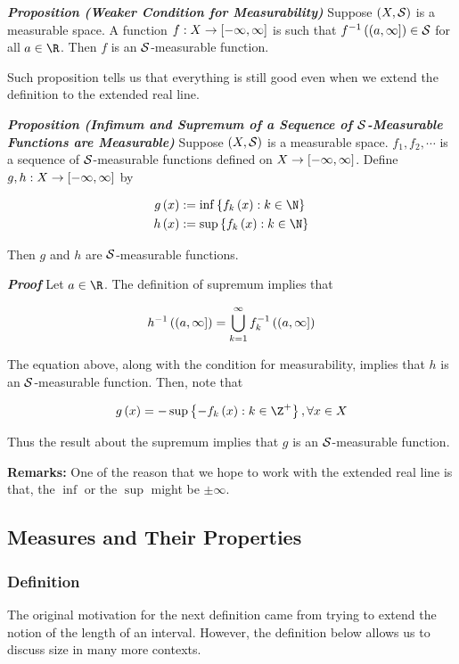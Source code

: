 \documentclass[
]{article}
\begin{document}
\emph{\textbf{Proposition (Weaker Condition for Measurability)}} Suppose
\(\pr{X,\S}\) is a measurable space. A function
\(f:X\to \br{-\infty,\infty}\) is such that
\(\inv f\pr{(a,\infty]}\in \S\) for all \(a \in \R\). Then \(f\) is an
\(\S\)-measurable function.

Such proposition tells us that everything is still good even when we
extend the definition to the extended real line.

\emph{\textbf{Proposition (Infimum and Supremum of a Sequence of
\(\S\)-Measurable Functions are Measurable)}} Suppose \(\pr{X,\S}\) is a
measurable space. \(f_1,f_2,\cdots\) is a sequence of \(\S\)-measurable
functions defined on \(X\to \br{-\infty,\infty}\). Define
\(g,h:X\to\br{-\infty,\infty}\) by

\[\ba
g\pr x &:= \inf\brace{f_k\pr x:k\in \N}\\
h\pr x &:= \sup\brace{f_k\pr x:k\in \N}
\ea\]

Then \(g\) and \(h\) are \(\S\)-measurable functions.

\emph{\textbf{Proof}} Let \(a\in \R\). The definition of supremum
implies that

\[\inv h\pr{(a,\infty]} = \uinf f_k^{-1}\pr{(a,\infty]}\]

The equation above, along with the condition for measurability, implies
that \(h\) is an \(\S\)-measurable function. Then, note that

\[g\pr{x} = -\sup\brace{-f_k\pr{x}:k\in \Z^+},\forall x\in X\]

Thus the result about the supremum implies that \(g\) is an
\(\S\)-measurable function.

\textbf{Remarks:} One of the reason that we hope to work with the
extended real line is that, the \(\inf\) or the \(\sup\) might be
\(\pm \infty\).

\hypertarget{measures-and-their-properties}{%
\subsection{Measures and Their
Properties}\label{measures-and-their-properties}}

\hypertarget{definition}{%
\subsubsection{Definition}\label{definition}}

The original motivation for the next definition came from trying to
extend the notion of the length of an interval. However, the definition
below allows us to discuss size in many more contexts.
\end{document}
